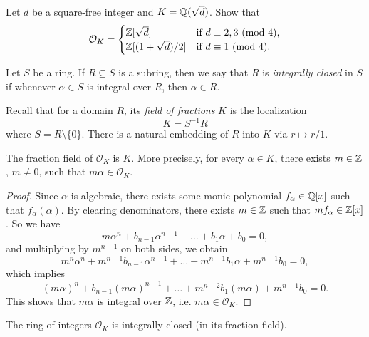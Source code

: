 \begin{exercise}
  Let $d$ be a square-free integer and
  $K = \mathbb{Q}(\sqrt{d})$. Show that
  \[
    \mathcal{O}_K =
    \begin{cases}
      \mathbb{Z}[\sqrt{d}] & \text{if $d \equiv 2, 3 \ (\mathrm{mod}\ 4)$}, \\
      \mathbb{Z}[(1 + \sqrt{d}) / 2] & \text{if $d \equiv 1 \ (\mathrm{mod}\ 4)$}.
    \end{cases}
  \]
\end{exercise}

\begin{definition}
  Let $S$ be a ring.
  If $R \subseteq S$ is a subring, then we say that
  $R$ is \emph{integrally closed} in $S$ if whenever
  $\alpha \in S$ is integral over $R$, then
  $\alpha \in R$.
\end{definition}

\begin{remark}
  Recall that for a domain $R$, its \emph{field of fractions} $K$ is the
  localization
  \[
    K = S^{-1} R
  \]
  where $S = R \setminus \{0\}$. There is a natural
  embedding of $R$ into $K$ via $r \mapsto r / 1$.
\end{remark}

\begin{lemma}
  The fraction field of $\mathcal{O}_K$ is $K$. More
  precisely, for every $\alpha \in K$, there exists
  $m \in \mathbb{Z}$, $m \ne 0$, such that $m\alpha \in \mathcal{O}_K$.
\end{lemma}

\begin{proof}
  Since $\alpha$ is algebraic, there exists some monic
  polynomial $f_\alpha \in \mathbb{Q}[x]$ such that
  $f_\alpha(\alpha)$. By clearing denominators, there
  exists $m \in \mathbb{Z}$ such that $mf_\alpha \in \mathbb{Z}[x]$.
  So we have
  \[
    m \alpha^n + b_{n - 1} \alpha^{n - 1} + \dots + b_1 \alpha + b_0 = 0,
  \]
  and multiplying by $m^{n - 1}$ on both sides, we obtain
  \[
    m^n \alpha^n + m^{n - 1} b_{n - 1} \alpha^{n - 1} + \dots + m^{n - 1} b_1 \alpha + m^{n - 1} b_0 = 0,
  \]
  which implies
  \[
    (m\alpha)^n + b_{n - 1} (m\alpha)^{n - 1} + \dots + m^{n - 2} b_1 (m\alpha) + m^{n - 1} b_0 = 0.
  \]
  This shows that $m\alpha$ is integral over $\mathbb{Z}$,
  i.e. $m\alpha \in \mathcal{O}_K$.
\end{proof}

\begin{theorem}
  The ring of integers $\mathcal{O}_K$ is
  integrally closed (in its fraction field).
\end{theorem}

